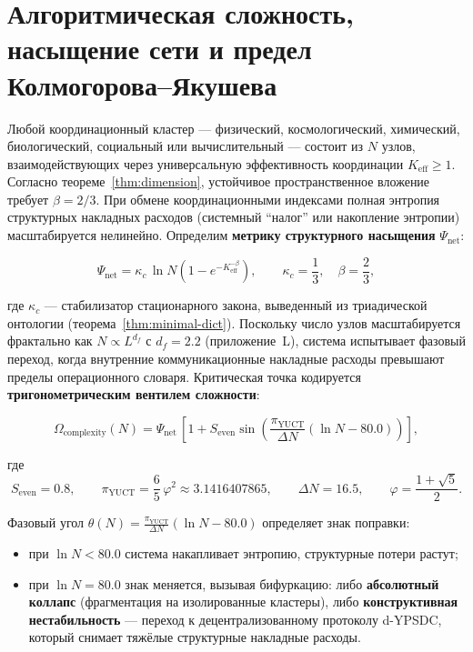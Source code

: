 \documentclass[12pt,a4paper]{article}
\theoremstyle{remark}
\newcommand{\Keff}{K_{\mathrm{eff}}}
\newcommand{\kappac}{\kappa_c}
\newcommand{\Seven}{S_{\mathrm{even}}}
\newcommand{\piYUCT}{\pi_{\mathrm{YUCT}}}
\begin{document}
	\sloppy
	\section{Алгоритмическая сложность, насыщение сети и предел Колмогорова--Якушева}
	\label{sec:complexity}
	
	Любой координационный кластер --- физический, космологический, химический, биологический, социальный или вычислительный --- состоит из \(N\) узлов, взаимодействующих через универсальную эффективность координации \(\Keff \ge 1\). Согласно теореме~\ref{thm:dimension}, устойчивое пространственное вложение требует \(\beta = 2/3\). При обмене координационными индексами полная энтропия структурных накладных расходов (системный ``налог'' или накопление энтропии) масштабируется нелинейно. Определим \textbf{метрику структурного насыщения} \(\Psi_{\mathrm{net}}\):
	
	\begin{equation}
		\Psi_{\mathrm{net}} = \kappac \, \ln N \left(1 - e^{-\Keff^{-\beta}}\right),
		\qquad \kappac = \frac{1}{3},\quad \beta = \frac{2}{3},
		\label{eq:Psi_net}
	\end{equation}
	
	где \(\kappac\) --- стабилизатор стационарного закона, выведенный из триадической онтологии (теорема~\ref{thm:minimal-dict}). Поскольку число узлов масштабируется фрактально как \(N \propto L^{d_f}\) с \(d_f = 2.2\) (приложение~L), система испытывает фазовый переход, когда внутренние коммуникационные накладные расходы превышают пределы операционного словаря. Критическая точка кодируется \textbf{тригонометрическим вентилем сложности}:
	
	\begin{equation}
		\Omega_{\mathrm{complexity}}(N) = \Psi_{\mathrm{net}} \,
		\left[1 + \Seven \sin\!\left( \frac{\piYUCT}{\Delta N} \left(\ln N - 80.0\right) \right) \right],
		\label{eq:Omega_complexity}
	\end{equation}
	
	где
	\[
	\Seven = 0.8,\qquad
	\piYUCT = \frac{6}{5}\,\varphi^2 \approx 3.1416407865,\qquad
	\Delta N = 16.5,\qquad
	\varphi = \frac{1+\sqrt{5}}{2}.
	\]
	
	Фазовый угол \(\theta(N) = \frac{\piYUCT}{\Delta N} (\ln N - 80.0)\) определяет знак поправки:
	\begin{itemize}
		\item при \(\ln N < 80.0\) система накапливает энтропию, структурные потери растут;
		\item при \(\ln N = 80.0\) знак меняется, вызывая бифуркацию: либо \textbf{абсолютный коллапс} (фрагментация на изолированные кластеры), либо \textbf{конструктивная нестабильность} --- переход к децентрализованному протоколу d-YPSDC, который снимает тяжёлые структурные накладные расходы.
	\end{itemize}
	
\end{document}
